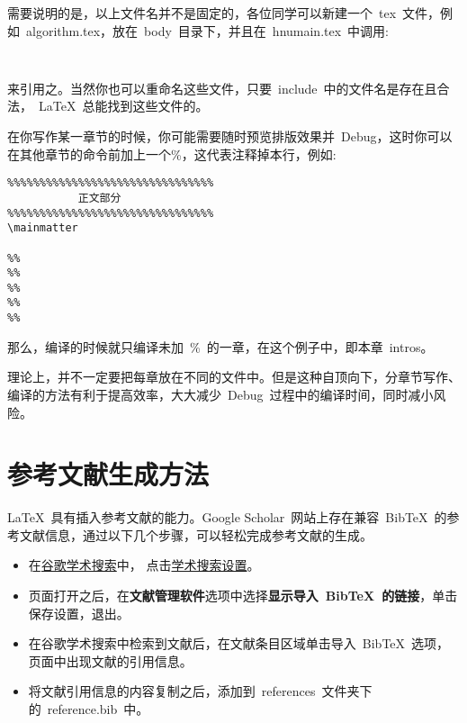 需要说明的是，以上文件名并不是固定的，各位同学可以新建一个~tex~文件，例如~algorithm.tex，放在~body~目录下，并且在~hnumain.tex~中调用:
\begin{verbatim}
    
\end{verbatim}
来引用之。当然你也可以重命名这些文件，只要~include~中的文件名是存在且合法，~\LaTeX~总能找到这些文件的。

在你写作某一章节的时候，你可能需要随时预览排版效果并~Debug，这时你可以在其他章节的\verb||命令前加上一个\%，这代表注释掉本行，例如:
\begin{verbatim}
%%%%%%%%%%%%%%%%%%%%%%%%%%%%%%%%
           正文部分
%%%%%%%%%%%%%%%%%%%%%%%%%%%%%%%%
\mainmatter

%%
%%
%%
%%
%%
\end{verbatim}
那么，编译的时候就只编译未加~\%~的一章，在这个例子中，即本章~intros。

理论上，并不一定要把每章放在不同的文件中。但是这种自顶向下，分章节写作、编译的方法有利于提高效率，大大减少~Debug~过程中的编译时间，同时减小风险。

\section{参考文献生成方法}

\LaTeX~具有插入参考文献的能力。Google Scholar~网站上存在兼容~BibTeX~的参考文献信息，通过以下几个步骤，可以轻松完成参考文献的生成。
\begin{itemize}
  \item 在\href{http://scholar.google.com/}{谷歌学术搜索}中，
        点击\href{http://scholar.google.com/scholar_preferences?hl=en&as_sdt=0,5}{学术搜索设置}。
  \item 页面打开之后，在\textbf{文献管理软件}选项中选择\textbf{显示导入~BibTeX~的链接}，单击保存设置，退出。
  \item 在谷歌学术搜索中检索到文献后，在文献条目区域单击导入~BibTeX~选项，页面中出现文献的引用信息。
  \item 将文献引用信息的内容复制之后，添加到~references~文件夹下的~reference.bib~中。
\end{itemize}

